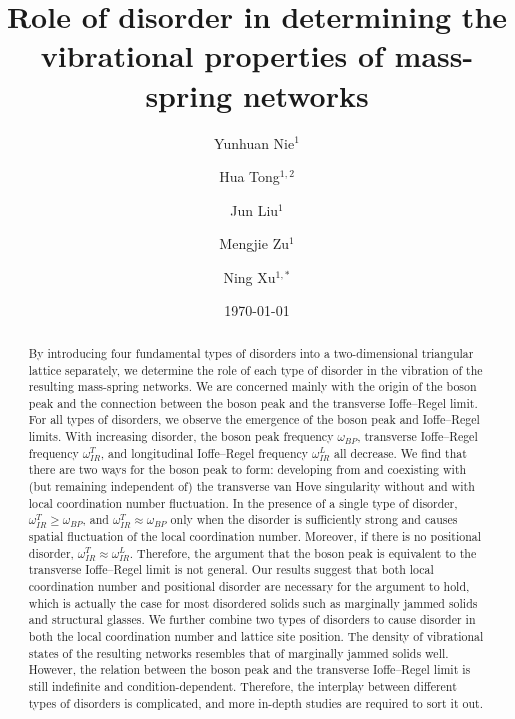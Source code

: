 \documentclass[twocolumn,printnumbers,amsmath,amssymb,prl,verbatim]{revtex4}
\begin{document}
\title{Role of disorder in determining the vibrational properties of mass-spring networks}

\date{\today}

\author{Yunhuan Nie$^1$}
\author{Hua Tong$^{1,2}$}
\author{Jun Liu$^1$}
\author{Mengjie Zu$^1$}
\author{Ning Xu$^{1,*}$}


\begin{abstract}

By introducing four fundamental types of disorders into a two-dimensional triangular lattice separately, we determine the role of each type of disorder in the vibration of the resulting mass-spring networks. We are concerned mainly with the origin of the boson peak and the connection between the boson peak and the transverse Ioffe--Regel limit. For all types of disorders, we observe the emergence of the boson peak and Ioffe--Regel limits. With increasing disorder, the boson peak frequency $\omega_{BP}$, transverse Ioffe--Regel frequency $\omega_{IR}^T$, and longitudinal Ioffe--Regel frequency $\omega_{IR}^L$ all decrease. We find that there are two ways for the boson peak to form: developing from and coexisting with (but remaining independent of) the transverse van Hove singularity without and with local coordination number fluctuation. In the presence of a single type of disorder, $\omega_{IR}^T\ge \omega_{BP}$, and $\omega_{IR}^T\approx \omega_{BP}$ only when the disorder is sufficiently strong and causes spatial fluctuation of the local coordination number. Moreover, if there is no positional disorder, $\omega_{IR}^T\approx \omega_{IR}^L$. Therefore, the argument that the boson peak is equivalent to the transverse Ioffe--Regel limit is not general. Our results suggest that both local coordination number and positional disorder are necessary for the argument to hold, which is actually the case for most disordered solids such as marginally jammed solids and structural glasses. We further combine two types of disorders to cause disorder in both the local coordination number and lattice site position. The density of vibrational states of the resulting networks resembles that of marginally jammed solids well. However, the relation between the boson peak and the transverse Ioffe--Regel limit is still indefinite and condition-dependent. Therefore, the interplay between different types of disorders is complicated, and more in-depth studies are required to sort it out.

\end{abstract}
\end{document}
